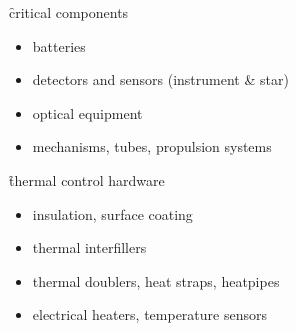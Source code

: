 \f{critical components}
\begin{itemize}
 \item batteries
 \item detectors and sensors (instrument \& star)
 \item optical equipment
 \item mechanisms, tubes, propulsion systems
\end{itemize}

\f{thermal control hardware}
\begin{itemize}
 \item insulation, surface coating
 \item thermal interfillers
 \item thermal doublers, heat straps, heatpipes
 \item electrical heaters, temperature sensors
\end{itemize}